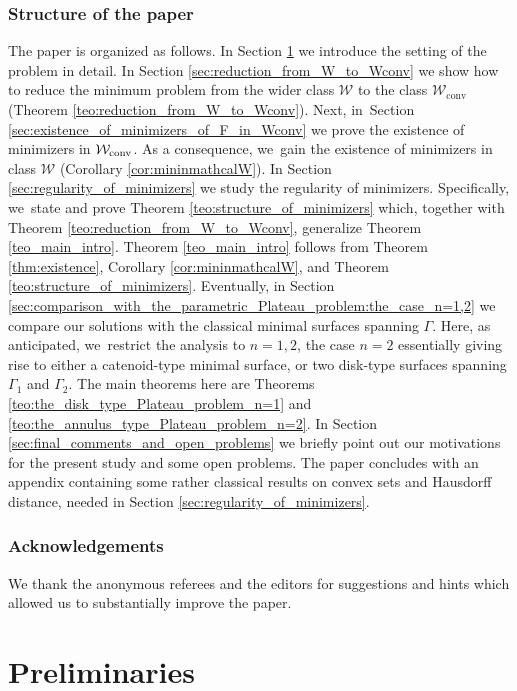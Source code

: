 \documentclass[JEP,XML,SOM,Unicode, NoFloatCountersInSection,published]{cedram}
\newcommand{\admclass}{\mathcal W}
\newcommand\admclassconv{{\mathcal W_\mathrm{conv}}}
\theoremstyle{definition}
\begin{document}
\subsubsection*{Structure of the paper} The paper is organized as follows.
In Section \ref{sec:preliminaries} we introduce the
setting of the problem in detail.
In Section
\ref{sec:reduction_from_W_to_Wconv}
we show how to reduce the minimum problem
from the wider class $\admclass$ to the class $\admclassconv$
(Theorem \ref{teo:reduction_from_W_to_Wconv}).
Next,
in~Section
\ref{sec:existence_of_minimizers_of_F_in_Wconv}
we prove the existence of minimizers in $\mathcal
W_{\textup{conv}}$. As a consequence, we~gain
the existence of minimizers in class $\mathcal W$ (Corollary \ref{cor:mininmathcalW}).
In Section
\ref{sec:regularity_of_minimizers} we study the regularity of minimizers. Specifically, we~state and prove Theorem \ref{teo:structure_of_minimizers}
which, together with Theorem \ref{teo:reduction_from_W_to_Wconv}, generalize Theorem \ref{teo_main_intro}. Theorem \ref{teo_main_intro}
follows from Theorem \ref{thm:existence}, Corollary \ref{cor:mininmathcalW}, and Theorem \ref{teo:structure_of_minimizers}.
Eventually, in Section \ref{sec:comparison_with_the_parametric_Plateau_problem:the_case_n=1,2}
we compare our solutions with the classical minimal surfaces spanning $\Gamma$. Here, as anticipated, we~restrict the analysis to $n=1,2$,
the case $n=2$ essentially giving rise to either a catenoid-type minimal surface, or two disk-type surfaces spanning $\Gamma_1$ and $\Gamma_2$. The main theorems here are Theorems \ref{teo:the_disk_type_Plateau_problem_n=1} and \ref{teo:the_annulus_type_Plateau_problem_n=2}.
In Section \ref{sec:final_comments_and_open_problems}
we briefly point out our motivations for the present study and some open problems.
The paper concludes with an appendix containing some rather classical
results on convex sets and Hausdorff distance, needed in
Section \ref{sec:regularity_of_minimizers}.

\subsubsection*{Acknowledgements}
We thank the anonymous referees and the editors for suggestions and hints which allowed us to substantially improve the paper.

\section{Preliminaries}\label{sec:preliminaries}
\end{document}
